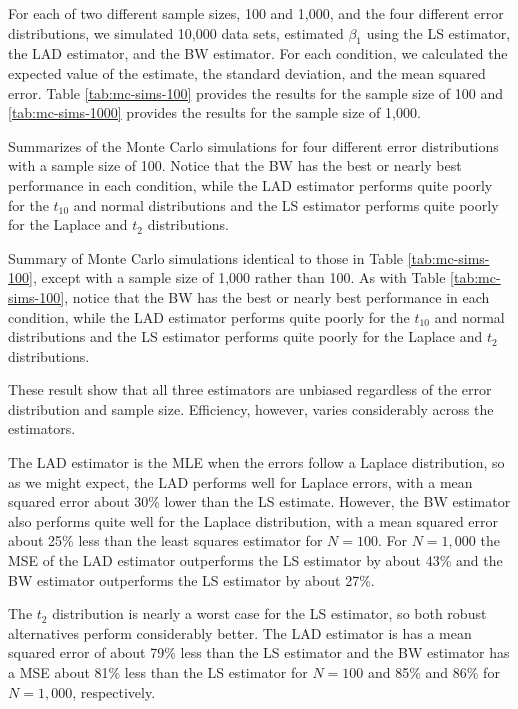 \documentclass[12pt]{article}
\begin{document}
For each of two different sample sizes, 100 and 1,000, and the four different error distributions, we simulated 10,000 data sets, estimated $\beta_1$ using the LS estimator, the LAD estimator, and the BW estimator. For each condition, we calculated the expected value of the estimate, the standard deviation, and the mean squared error. Table \ref{tab:mc-sims-100} provides the results for the sample size of 100 and \ref{tab:mc-sims-1000} provides the results for the sample size of 1,000. 

\begin{table}[h!]
{\small

}
\caption{Summarizes of the Monte Carlo simulations for four different error distributions with a sample size of 100. Notice that the BW has the best or nearly best performance in each condition, while the LAD estimator performs quite poorly for the $t_{10}$ and normal distributions and the LS estimator performs quite poorly for the Laplace and $t_2$ distributions.}\label{tab:mc-sims-100}
\end{table}

\begin{table}[h!]
{\small

}
\caption{Summary of Monte Carlo simulations identical to those in Table \ref{tab:mc-sims-100}, except with a sample size of 1,000 rather than 100. As with Table \ref{tab:mc-sims-100}, notice that the BW has the best or nearly best performance in each condition, while the LAD estimator performs quite poorly for the $t_{10}$ and normal distributions and the LS estimator performs quite poorly for the Laplace and $t_2$ distributions.}\label{tab:mc-sims-1000}
\end{table}

These result show that all three estimators are unbiased regardless of the error distribution and sample size. Efficiency, however, varies considerably across the estimators.

The LAD estimator is the MLE when the errors follow a Laplace distribution, so as we might expect, the LAD performs well for Laplace errors, with a mean squared error about 30\% lower than the LS estimate. However, the BW estimator also performs quite well for the Laplace distribution, with a mean squared error about 25\% less than the least squares estimator for $N = 100$. For $N = 1,000$ the MSE of the LAD estimator outperforms the LS estimator by about 43\% and the BW estimator outperforms the LS estimator by about 27\%.

The $t_2$ distribution is nearly a worst case for the LS estimator, so both robust alternatives perform considerably better. The LAD estimator is has a mean squared error of about 79\% less than the LS estimator and the BW estimator has a MSE about 81\% less than the LS estimator for $N = 100$ and 85\% and 86\% for $N = 1,000$, respectively. 
\end{document}
